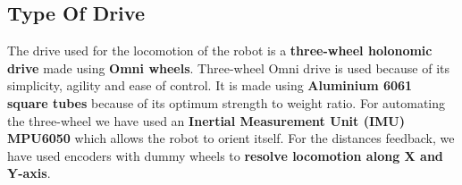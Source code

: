 
    \subsection{Type Of Drive}
        The drive used for the locomotion of the robot is a \textbf{three-wheel holonomic drive} made using \textbf{Omni wheels}. Three-wheel Omni drive is 
        used because of its simplicity, agility and ease of control. It is made using \textbf{Aluminium 6061 square tubes} because of its optimum 
        strength to weight ratio. For automating the three-wheel we have used an \textbf{Inertial Measurement Unit (IMU) MPU6050} which allows 
        the robot to orient itself. For the distances feedback, we have used encoders with dummy wheels to \textbf{resolve locomotion along X and 
        Y-axis}.



